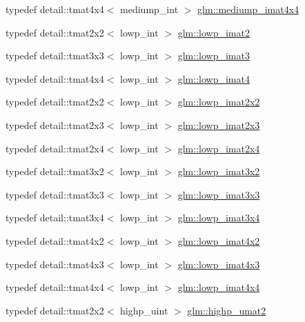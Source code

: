 \begin{DoxyCompactItemize}
typedef detail\+::tmat4x4$<$ mediump\+\_\+int $>$ \hyperlink{group__gtc__matrix__integer_gaced73f9aecd6626cdfef5bfb3648b750}{glm\+::mediump\+\_\+imat4x4}
\item 
typedef detail\+::tmat2x2$<$ lowp\+\_\+int $>$ \hyperlink{group__gtc__matrix__integer_ga70fa8b07f1a12d400d669e4978a6795c}{glm\+::lowp\+\_\+imat2}
\item 
typedef detail\+::tmat3x3$<$ lowp\+\_\+int $>$ \hyperlink{group__gtc__matrix__integer_ga5ce884d9735040424846bc45671b446a}{glm\+::lowp\+\_\+imat3}
\item 
typedef detail\+::tmat4x4$<$ lowp\+\_\+int $>$ \hyperlink{group__gtc__matrix__integer_ga644e005864dce94a642fcfe939538deb}{glm\+::lowp\+\_\+imat4}
\item 
typedef detail\+::tmat2x2$<$ lowp\+\_\+int $>$ \hyperlink{group__gtc__matrix__integer_gaaf7a95922fb146929cb174eea1cac2a8}{glm\+::lowp\+\_\+imat2x2}
\item 
typedef detail\+::tmat2x3$<$ lowp\+\_\+int $>$ \hyperlink{group__gtc__matrix__integer_ga09e5448647001fa527ea02951cbca6ec}{glm\+::lowp\+\_\+imat2x3}
\item 
typedef detail\+::tmat2x4$<$ lowp\+\_\+int $>$ \hyperlink{group__gtc__matrix__integer_ga413aeb4042293dc84969db1e8f3d0619}{glm\+::lowp\+\_\+imat2x4}
\item 
typedef detail\+::tmat3x2$<$ lowp\+\_\+int $>$ \hyperlink{group__gtc__matrix__integer_gac67f73a4e34205b8d96af7e85cc7a194}{glm\+::lowp\+\_\+imat3x2}
\item 
typedef detail\+::tmat3x3$<$ lowp\+\_\+int $>$ \hyperlink{group__gtc__matrix__integer_ga3e100ab14fdaeae0d30d66d93c6904a7}{glm\+::lowp\+\_\+imat3x3}
\item 
typedef detail\+::tmat3x4$<$ lowp\+\_\+int $>$ \hyperlink{group__gtc__matrix__integer_gaefcf7682fee103d6f8c9315420a6bcd5}{glm\+::lowp\+\_\+imat3x4}
\item 
typedef detail\+::tmat4x2$<$ lowp\+\_\+int $>$ \hyperlink{group__gtc__matrix__integer_ga6b4261f0c13ebc56e2bc76bf7170830c}{glm\+::lowp\+\_\+imat4x2}
\item 
typedef detail\+::tmat4x3$<$ lowp\+\_\+int $>$ \hyperlink{group__gtc__matrix__integer_gaae7774306f7549793307afb385738163}{glm\+::lowp\+\_\+imat4x3}
\item 
typedef detail\+::tmat4x4$<$ lowp\+\_\+int $>$ \hyperlink{group__gtc__matrix__integer_gaac17bd47c20d89a75d933f21e79e3411}{glm\+::lowp\+\_\+imat4x4}
\item 
typedef detail\+::tmat2x2$<$ highp\+\_\+uint $>$ \hyperlink{group__gtc__matrix__integer_ga65158bd3fa138afe2c389a8e50e22c27}{glm\+::highp\+\_\+umat2}

\end{DoxyCompactItemize}
